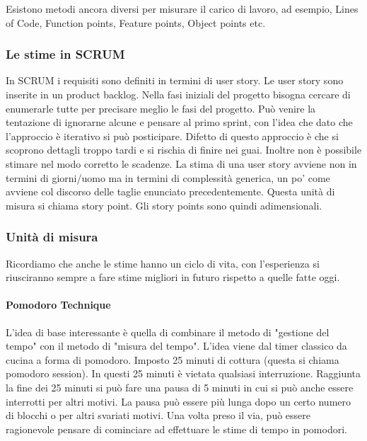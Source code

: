 \noindent Esistono metodi ancora diversi per misurare il carico di lavoro, ad esempio, Lines of Code, Function points, Feature points, Object points etc.

\subsubsection{Le stime in SCRUM}
In SCRUM i requisiti sono definiti in termini di user story. Le user story sono inserite in un product backlog. Nella fasi iniziali del progetto bisogna cercare di enumerarle tutte per precisare meglio le fasi del progetto. Può venire la tentazione di ignorarne alcune e pensare al primo sprint, con l'idea che dato che l'approccio è iterativo si può posticipare. Difetto di questo approccio è che si scoprono dettagli troppo tardi e si rischia di finire nei guai. Inoltre non è possibile stimare nel modo corretto le scadenze. La stima di una user story avviene non in termini di giorni/uomo ma in termini di complessità generica, un po' come avviene col discorso delle taglie enunciato precedentemente. Questa unità di misura si chiama story point. Gli story points sono quindi adimensionali.
\subsubsection{Unità di misura}
Ricordiamo che anche le stime hanno un ciclo di vita, con l'esperienza si riusciranno sempre a fare stime migliori in futuro rispetto a quelle fatte oggi.
\paragraph{Pomodoro Technique}
L'idea di base interessante è quella di combinare il metodo di "gestione del tempo" con il metodo di "misura del tempo". L'idea viene dal timer classico da cucina a forma di pomodoro. Imposto 25 minuti di cottura (questa si chiama pomodoro session). In questi 25 minuti è vietata qualsiasi interruzione. Raggiunta la fine dei 25 minuti si può fare una pausa di 5 minuti in cui si può anche essere interrotti per altri motivi. La pausa può essere più lunga dopo un certo numero di blocchi o per altri svariati motivi.\newline
Una volta preso il via, può essere ragionevole pensare di cominciare ad effettuare le stime di tempo in pomodori.
